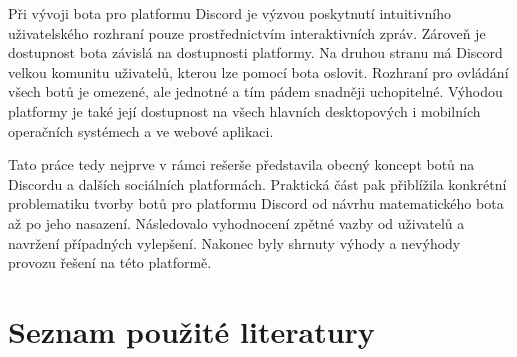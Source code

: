 \documentclass[FM]{tulthesis}
\begin{document}
	Při vývoji bota pro platformu Discord je výzvou poskytnutí intuitivního uživatelského rozhraní pouze prostřednictvím interaktivních zpráv. Zároveň je dostupnost bota závislá na dostupnosti platformy. Na druhou stranu má Discord velkou komunitu uživatelů, kterou lze pomocí bota oslovit. Rozhraní pro ovládání všech botů je omezené, ale jednotné a tím pádem snadněji uchopitelné. Výhodou platformy je také její dostupnost na všech hlavních desktopových i mobilních operačních systémech a ve webové aplikaci.
	
	Tato práce tedy nejprve v rámci rešerše představila obecný koncept botů na Discordu a dalších sociálních platformách. Praktická část pak přiblížila konkrétní problematiku tvorby botů pro platformu Discord od návrhu matematického bota až po jeho nasazení. Následovalo vyhodnocení zpětné vazby od uživatelů a navržení případných vylepšení. Nakonec byly shrnuty výhody a nevýhody provozu řešení na této platformě.

	\chapter*{Seznam použité literatury}
	\printbibliography[heading=none]
	
	\appendix	
\end{document}
